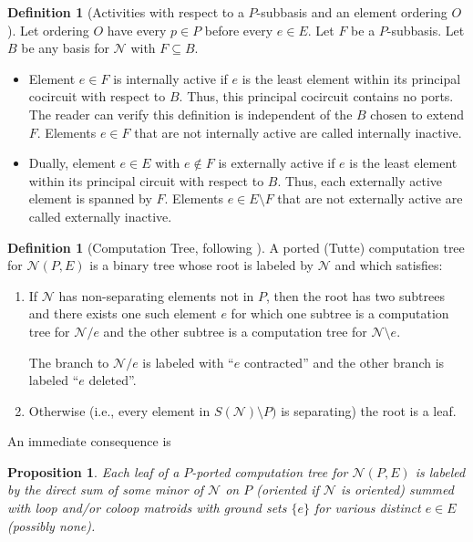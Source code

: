 \documentclass[12pt]{article}
\newtheorem{proposition}[theorem]{Proposition}
\theoremstyle{definition}
\newtheorem{definition}[theorem]{Definition}
\begin{document}
\begin{definition}[Activities with respect to a $P$-subbasis and an element
ordering $O$]
Let ordering $O$ have every $p\in P$ before every
$e\in E$.  Let $F$ be a $P$-subbasis.  Let $B$ be any basis for 
$\mathcal{N}$ with $F\subseteq B$.
\begin{itemize}
\item Element $e\in F$
is internally active if $e$ is the least element
within its principal cocircuit with respect to $B$.  Thus, this principal
cocircuit contains no ports.  The reader can verify this definition is 
independent of the $B$ chosen to extend $F$.  Elements $e\in F$ that are
not internally active are called internally inactive.
\item Dually, element $e\in E$ with $e\not\in F$ is externally 
active if $e$ is the least element within its principal circuit with
respect to $B$.  Thus, each externally active element is spanned by 
$F$.  Elements $e\in E\setminus F$ that are not externally active
are called externally inactive.
\end{itemize}
\end{definition}

\begin{definition}[Computation Tree, following \cite{GordonMcMachonGreedoid}]
\label{CompTreeDef}
A ported (Tutte) computation tree for $\mathcal{N}(P,E)$ is a
binary tree whose root is labeled by $\mathcal{N}$ and which satisfies:
\begin{enumerate}
\item If $\mathcal{N}$ has non-separating elements not in $P$, then 
the root has two subtrees and there exists one such element $e$ for which 
one subtree is a computation tree
for $\mathcal{N}/e$ and the other subtree is a computation tree for 
$\mathcal{N}\setminus e$.

The branch to $\mathcal{N}/e$ is labeled with ``$e$ contracted'' and 
the other branch is labeled ``$e$ deleted''.
\item Otherwise (i.e., every element in $S(\mathcal{N})\setminus P)$
is separating) the root is a leaf.
\end{enumerate}
\end{definition}

An immediate consequence is
\begin{proposition}
Each leaf of a $P$-ported computation tree for $\mathcal{N}(P,E)$
is labeled by the direct sum of some minor of $\mathcal{N}$ on $P$ 
(oriented if $\mathcal{N}$ is oriented) 
summed with loop and/or coloop matroids with 
ground sets $\{e\}$ for various distinct $e\in E$ (possibly none).
\end{proposition}
\end{document}
